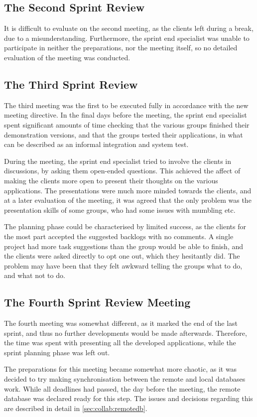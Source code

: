 \subsection{The Second Sprint Review}
\label{collab:sprintend:two}
It is difficult to evaluate on the second meeting, as the clients left during a break, due to a misunderstanding.
Furthermore, the sprint end specialist was unable to participate in neither the preparations, nor the meeting itself, so no detailed evaluation of the meeting was conducted.

\subsection{The Third Sprint Review}
\label{collab:sprintend:three}
The third meeting was the first to be executed fully in accordance with the new meeting directive.
In the final days before the meeting, the sprint end specialist spent significant amounts of time checking that the various groups finished their demonstration versions, and that the groups tested their applications, in what can be described as an informal integration and system test. 

During the meeting, the sprint end specialist tried to involve the clients in discussions, by asking them open-ended questions.
This achieved the affect of making the clients more open to present their thoughts on the various applications.
The presentations were much more minded towards the clients, and at a later evaluation of the meeting, it was agreed that the only problem was the presentation skills of some groups, who had some issues with mumbling etc.

The planning phase could be characterised by limited success, as the clients for the most part accepted the suggested backlogs with no comments.
A single project had more task suggestions than the group would be able to finish, and the clients were asked directly to opt one out, which they hesitantly did.
The problem may have been that they felt awkward telling the groups what to do, and what not to do.

\subsection{The Fourth Sprint Review Meeting}
\label{collab:sprintend:four}
The fourth meeting was somewhat different, as it marked the end of the last sprint, and thus no further developments would be made afterwards.
Therefore, the time was spent with presenting all the developed applications, while the sprint planning phase was left out. 

The preparations for this meeting became somewhat more chaotic, as it was decided to try making synchronisation between the remote and local databases work.
While all deadlines had passed, the day before the meeting, the remote database was declared ready for this step.
The issues and decisions regarding this are described in detail in \cref{sec:collab:remotedb}.